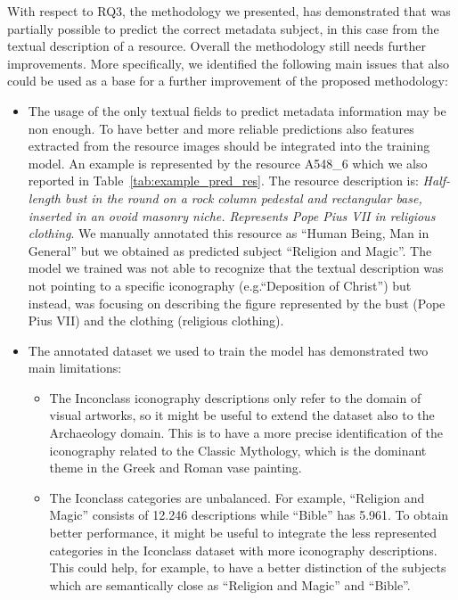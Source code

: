 \documentclass[epsfig,a4paper,12pt,titlepage]{book}
\begin{document}
With respect to RQ3, the methodology we presented, has demonstrated that was partially possible to predict the correct metadata subject, in this case from the textual description of a resource. Overall the methodology still needs further improvements.
More specifically, we identified the following main issues that also could be used as a base for a further improvement of the proposed methodology:

\begin{itemize}
\item The usage of the only textual fields to predict metadata information may be non enough. To have better and more reliable predictions also features extracted from the resource images should be integrated into the training model. An example is represented by the resource A548\_6 which we also reported in Table~\ref{tab:example_pred_res}. The resource description is: \textit{Half-length bust in the round on a rock column pedestal and rectangular base, inserted in an ovoid masonry niche. Represents Pope Pius VII in religious clothing}. We manually annotated this resource as ``Human Being, Man in General'' but we obtained as predicted subject ``Religion and Magic''. The model we trained was not able to recognize that the textual description was not pointing to a specific iconography (e.g.``Deposition of Christ'') but instead, was focusing on describing the figure represented by the bust (Pope Pius VII) and the clothing (religious clothing).

\item The annotated dataset we used to train the model has demonstrated two main limitations:
\begin{itemize}
\item The Inconclass iconography descriptions only refer to the domain of visual artworks, so it might be useful to extend the dataset also to the Archaeology domain. This is to have a more precise identification of the iconography related to the Classic Mythology, which is the dominant theme in the Greek and Roman vase painting.  
\item The Iconclass categories are unbalanced. For example, ``Religion and Magic'' consists of 12.246 descriptions while ``Bible'' has 5.961. To obtain better performance, it might be useful to integrate the less represented categories in the Iconclass dataset with more iconography descriptions. This could help, for example, to have a better distinction of the subjects which are semantically close as ``Religion and Magic'' and ``Bible''. 
\end{itemize}
\end{itemize}
\end{document}
